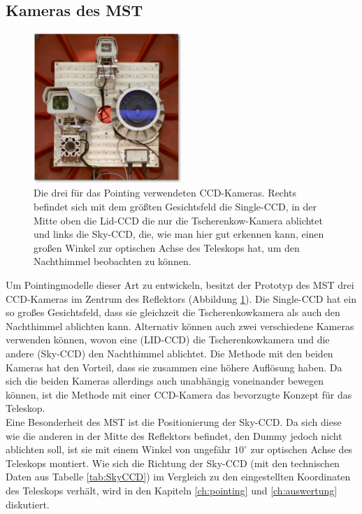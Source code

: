 \subsection{Kameras des MST}
\label{se:cameras}
\begin{figure}
\centering
\includegraphics[width=0.5\textwidth]{Images/ccd.png}
\caption{Die drei für das Pointing verwendeten CCD-Kameras. Rechts befindet sich mit dem größten Gesichtsfeld die Single-CCD, in der Mitte oben die Lid-CCD die nur die Tscherenkow-Kamera ablichtet und links die Sky-CCD, die, wie man hier gut erkennen kann, einen großen Winkel zur optischen Achse des Teleskops hat, um den Nachthimmel beobachten zu können.}
\label{img:cameras}
\end{figure}
Um Pointingmodelle dieser Art zu entwickeln, besitzt der Prototyp des MST drei CCD-Kameras im Zentrum des Reflektors (Abbildung \ref{img:cameras}). Die Single-CCD hat ein so großes Gesichtsfeld, dass sie gleichzeit die Tscherenkowkamera als auch den Nachthimmel ablichten kann. Alternativ können auch zwei verschiedene Kameras verwenden können, wovon eine (LID-CCD) die Tscherenkowkamera und die andere (Sky-CCD) den Nachthimmel ablichtet. Die Methode mit den beiden Kameras hat den Vorteil, dass sie zusammen eine höhere Auflösung haben. Da sich die beiden Kameras allerdings auch unabhängig voneinander bewegen können, ist die Methode mit einer CCD-Kamera das bevorzugte Konzept für das Teleskop\cite{pos}.\\
Eine Besonderheit des MST ist die Positionierung der Sky-CCD. Da sich diese wie die anderen in der Mitte des Reflektors befindet, den Dummy jedoch nicht ablichten soll, ist sie mit einem Winkel von ungefähr $10^{\circ}$ zur optischen Achse des Teleskops montiert. Wie sich die Richtung der Sky-CCD (mit den technischen Daten aus Tabelle \ref{tab:SkyCCD}) im Vergleich zu den eingestellten Koordinaten des Teleskops verhält, wird in den Kapiteln \ref{ch:pointing} und \ref{ch:auswertung} diskutiert.


